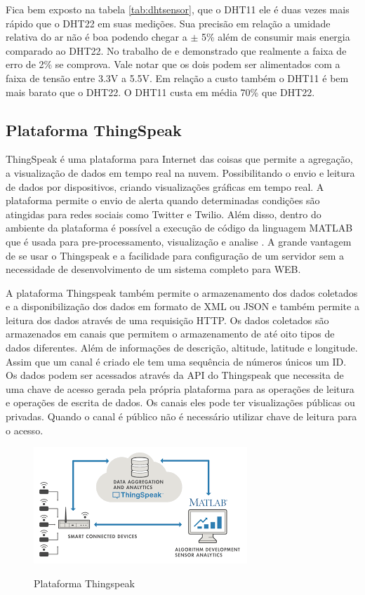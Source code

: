 Fica bem exposto na tabela \ref{tab:dhtsensor}, que o DHT11 ele é duas vezes mais rápido que o DHT22 em suas medições. Sua precisão em relação a umidade relativa do ar não é boa podendo chegar a $\pm$ 5\% além de consumir mais energia comparado ao DHT22. No trabalho de \cite{ribeiro2016avaliaccao} e demonstrado que realmente a faixa de erro de 2\% se comprova. Vale notar que os dois podem ser alimentados com a faixa de tensão entre 3.3V a 5.5V. Em relação a custo também o DHT11 é bem mais barato que o DHT22. O DHT11 custa em média 70\% que DHT22.



\subsection{Plataforma ThingSpeak}

ThingSpeak é uma plataforma para Internet das coisas que permite a agregação, a visualização de dados em tempo real na nuvem. Possibilitando o envio e leitura de dados por dispositivos, criando visualizações gráficas em tempo real. A plataforma permite o envio de alerta quando determinadas condições são atingidas para redes sociais como Twitter e Twilio. Além disso, dentro do ambiente da plataforma é possível a execução de código da linguagem MATLAB que é usada para pre-processamento, visualização e analise \cite{ThinkSpeak}. A grande vantagem de se usar o Thingspeak e a facilidade para configuração de um servidor sem a necessidade de desenvolvimento de um sistema completo para WEB.

A plataforma Thingspeak também permite o armazenamento dos dados coletados e a disponibilização dos dados em formato de XML ou JSON e também permite a leitura dos dados através de uma requisição HTTP. Os dados coletados são armazenados em canais que permitem o armazenamento de até oito tipos de dados diferentes. Além de informações de descrição, altitude, latitude e longitude. Assim que um canal é criado ele tem uma sequência de números únicos um ID. Os dados podem ser acessados através da API do Thingspeak que necessita de uma chave de acesso gerada pela própria plataforma para as operações de leitura e operações de escrita de dados. Os canais eles pode ter visualizações públicas ou privadas. Quando o canal é público não é necessário utilizar chave de leitura para o acesso.

\begin{figure}[h!]
    \centering
    \caption{Plataforma Thingspeak}
    \includegraphics{Figuras/think_speak.png}
    \label{fig:thinkSpeak}
\end{figure}

